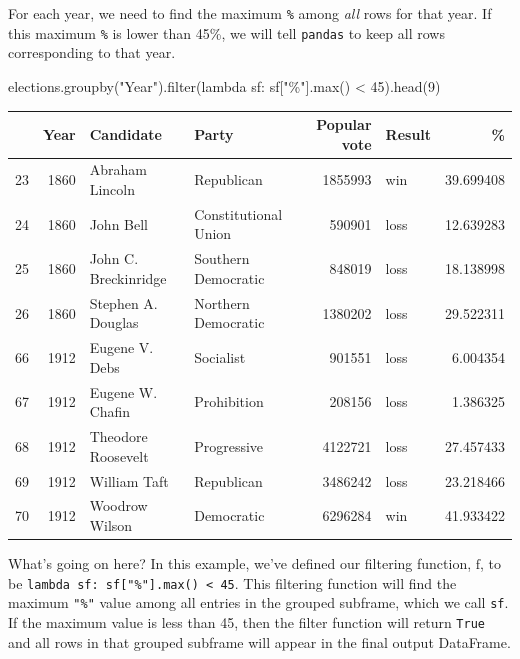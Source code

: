 \documentclass[
  letterpaper,
  DIV=11,
  numbers=noendperiod]{scrreprt}
\newenvironment{Shaded}{\begin{snugshade}}{\end{snugshade}}
\newcommand{\BuiltInTok}[1]{\textcolor[rgb]{0.00,0.23,0.31}{#1}}
\newcommand{\DecValTok}[1]{\textcolor[rgb]{0.68,0.00,0.00}{#1}}
\newcommand{\KeywordTok}[1]{\textcolor[rgb]{0.00,0.23,0.31}{#1}}
\newcommand{\NormalTok}[1]{\textcolor[rgb]{0.00,0.23,0.31}{#1}}
\newcommand{\OperatorTok}[1]{\textcolor[rgb]{0.37,0.37,0.37}{#1}}
\newcommand{\StringTok}[1]{\textcolor[rgb]{0.13,0.47,0.30}{#1}}
\begin{document}
For each year, we need to find the maximum \texttt{\%} among \emph{all}
rows for that year. If this maximum \texttt{\%} is lower than 45\%, we
will tell \texttt{pandas} to keep all rows corresponding to that year.

\begin{Shaded}
\begin{Highlighting}[]
\NormalTok{elections.groupby(}\StringTok{"Year"}\NormalTok{).}\BuiltInTok{filter}\NormalTok{(}\KeywordTok{lambda}\NormalTok{ sf: sf[}\StringTok{"\%"}\NormalTok{].}\BuiltInTok{max}\NormalTok{() }\OperatorTok{\textless{}} \DecValTok{45}\NormalTok{).head(}\DecValTok{9}\NormalTok{)}
\end{Highlighting}
\end{Shaded}

\begin{tabular}{lrllrlr}
\toprule
{} &  Year &             Candidate &                 Party &  Popular vote & Result &          \% \\
\midrule
23 &  1860 &       Abraham Lincoln &            Republican &       1855993 &    win &  39.699408 \\
24 &  1860 &             John Bell &  Constitutional Union &        590901 &   loss &  12.639283 \\
25 &  1860 &  John C. Breckinridge &   Southern Democratic &        848019 &   loss &  18.138998 \\
26 &  1860 &    Stephen A. Douglas &   Northern Democratic &       1380202 &   loss &  29.522311 \\
66 &  1912 &        Eugene V. Debs &             Socialist &        901551 &   loss &   6.004354 \\
67 &  1912 &      Eugene W. Chafin &           Prohibition &        208156 &   loss &   1.386325 \\
68 &  1912 &    Theodore Roosevelt &           Progressive &       4122721 &   loss &  27.457433 \\
69 &  1912 &          William Taft &            Republican &       3486242 &   loss &  23.218466 \\
70 &  1912 &        Woodrow Wilson &            Democratic &       6296284 &    win &  41.933422 \\
\bottomrule
\end{tabular}

What's going on here? In this example, we've defined our filtering
function, \(\text{f}\), to be
\texttt{lambda\ sf:\ sf{[}"\%"{]}.max()\ \textless{}\ 45}. This
filtering function will find the maximum \texttt{"\%"} value among all
entries in the grouped subframe, which we call \texttt{sf}. If the
maximum value is less than 45, then the filter function will return
\texttt{True} and all rows in that grouped subframe will appear in the
final output DataFrame.
\end{document}
